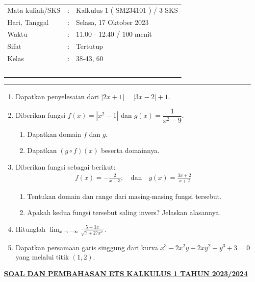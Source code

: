\documentclass[10pt,openany,a4paper]{article}
\theoremstyle{definition}
\theoremstyle{definition}
\theoremstyle{plain}
\begin{document}
    \begin{center}
	\begin{tabular}{lcl}
		Mata kuliah/SKS & : & Kalkulus 1 ( SM234101 ) / 3 SKS\\
		Hari, Tanggal & : & Selasa, 17 Oktober 2023\\
		Waktu & : & 11.00 - 12.40 / 100 menit\\
		Sifat & : & Tertutup\\
		Kelas & : & 38-43, 60\\
  ~
	\end{tabular}

    \noindent\rule{\textwidth}{2.pt}
        \end{center}
    \begin{enumerate}
    \item Dapatkan penyelesaian dari $|2x+1|=|3x-2|+1$.

    \item Diberikan fungsi $f(x)=|x^2-1|$ dan $g(x)=\dfrac{1}{x^2-9}$.
    \begin{enumerate}
        \item Dapatkan domain $f$ dan $g$.
        \item Dapatkan $(g\circ f)(x)$ beserta domainnya.
    \end{enumerate}

    \item Diberikan fungsi sebagai berikut:
    \begin{align*}
        f(x)=-\frac{2}{x+3};\quad \text{dan}\quad g(x)=\frac{3x+2}{x+2}
    \end{align*}
    \begin{enumerate}
        \item Tentukan domain dan range dari masing-masing fungsi tersebut.
        \item Apakah kedua fungsi tersebut saling invers? Jelaskan alasannya.
    \end{enumerate}

    \item Hitunglah $\displaystyle\lim_{x\to-\infty}\frac{5-3x}{\sqrt{7+27x^2}}$.

    \item Dapatkan persamaan garis singgung dari kurva $x^3-2x^2y+2xy^2-y^3+3=0$ yang melalui titik $(1,2)$.
\end{enumerate}
\newpage
 \begin{center}
	{\underline{\textbf{\MakeUppercase{Soal dan Pembahasan ETS Kalkulus 1 Tahun 2023/2024}}}}
    \end{center}
\end{document}

